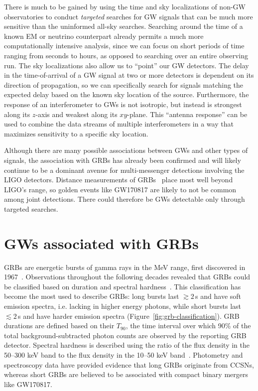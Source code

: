 There is much to be gained by using the time and sky localizations of non-GW observatories to conduct \textit{targeted} searches for GW signals that can be much more sensitive than the uninformed all-sky searches.
Searching around the time of a known EM or neutrino counterpart already permits a much more computationally intensive analysis, since we can focus on short periods of time ranging from seconds to hours, as opposed to searching over an entire observing run.
The sky localizations also allow us to ``point'' our GW detectors.
The delay in the time-of-arrival of a GW signal at two or more detectors is dependent on its direction of propagation, so we can specifically search for signals matching the expected delay based on the known sky location of the source.
Furthermore, the response of an interferometer to GWs is not isotropic, but instead is strongest along its $z$-axis and weakest along its $xy$-plane.
This ``antenna response'' can be used to combine the data streams of multiple interferometers in a way that maximizes sensitivity to a specific sky location.

Although there are many possible associations between GWs and other types of signals, the association with \acp{GRB} has already been confirmed and will likely continue to be a dominant avenue for multi-messenger detections involving the LIGO detectors.
Distance measurements of GRBs~\citep{swift_archive} place most well beyond LIGO's range, so golden events like GW170817 are likely to not be common among joint detections.
There could therefore be GWs detectable only through targeted searches.


\section{GWs associated with GRBs}\label{sec:gw-grb}

\Acp{GRB} are energetic bursts of gamma rays in the MeV range, first discovered in 1967~\citep{Klebesadel_1973}.
Observations throughout the following decades revealed that \acp{GRB} could be classified based on duration and spectral hardness~\citep{Kouveliotou_1993}.
This classification has become the most used to describe \acp{GRB}: long bursts last $\gtrsim2$\,s and have soft emission spectra, i.e. lacking in higher energy photons, while short bursts last $\lesssim2$\,s and have harder emission spectra (Figure~\ref{fig:grb-classification}).
GRB durations are defined based on their $T_{90}$, the time interval over which 90\% of the total background-subtracted photon counts are observed by the reporting GRB detector.
Spectral hardness is described using the ratio of the flux density in the 50–300 keV band to the flux density in the 10–50 keV band~\citep{fermi_2020}.
Photometry and spectroscopy data have provided evidence that long \acp{GRB} originate from \acp{CCSN}, whereas short \acp{GRB} are believed to be associated with compact binary mergers like GW170817.

